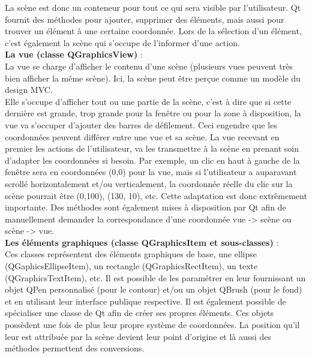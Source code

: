 \documentclass[french]{article}
\begin{document}
	La scène est donc un conteneur pour tout ce qui sera visible par l'utilisateur. Qt fournit des méthodes pour ajouter, supprimer des éléments, mais aussi pour trouver un élément à une certaine coordonnée. Lors de la sélection d'un élément, c'est également la scène qui s'occupe de l'informer d'une action. \\
	
	\textbf{La vue (classe QGraphicsView)} : \\
	La vue se charge d'afficher le contenu d'une scène (plusieurs vues peuvent très bien afficher la même scène). Ici, la scène peut être perçue comme un modèle du design MVC. \\
	Elle s'occupe d'afficher tout ou une partie de la scène, c'est à dire que si cette dernière est grande, trop grande pour la fenêtre ou pour la zone à disposition, la vue va s'occuper d'ajouter des barres de défilement. Ceci engendre que les coordonnées peuvent différer entre une vue et sa scène. La vue recevant en premier les actions de l'utilisateur, va les transmettre à la scène en prenant soin d'adapter les coordonnées si besoin. Par exemple, un clic en haut à gauche de la fenêtre sera en coordonnées (0,0) pour la vue, mais si l'utilisateur a auparavant scrollé horizontalement et/ou verticalement, la coordonnée réelle du clic sur la scène pourrait être (0,100), (130, 10), etc. Cette adaptation est donc extrêmement importante. Des méthodes sont également mises à disposition par Qt afin de manuellement demander la correspondance d'une coordonnée vue -> scène ou scène -> vue. \\
	
	\textbf{Les éléments graphiques (classe QGraphicsItem et sous-classes)} : \\
	Ces classes représentent des éléments graphiques de base, une ellipse (QGaphicsEllipseItem), un rectangle (QGraphicsRectItem), un texte (QGraphicsTextItem), etc. Il est possible de les paramétrer en leur fournissant un objet QPen personnalisé (pour le contour) et/ou un objet QBrush (pour le fond) et en utilisant leur interface publique respective. Il est également possible de spécialiser une classe de Qt afin de créer ses propres éléments.
	Ces objets possèdent une fois de plus leur propre système de coordonnées. La position qu'il leur est attribuée par la scène devient leur point d'origine et là aussi des méthodes permettent des conversions.
	
	\pagebreak
	
\end{document}
